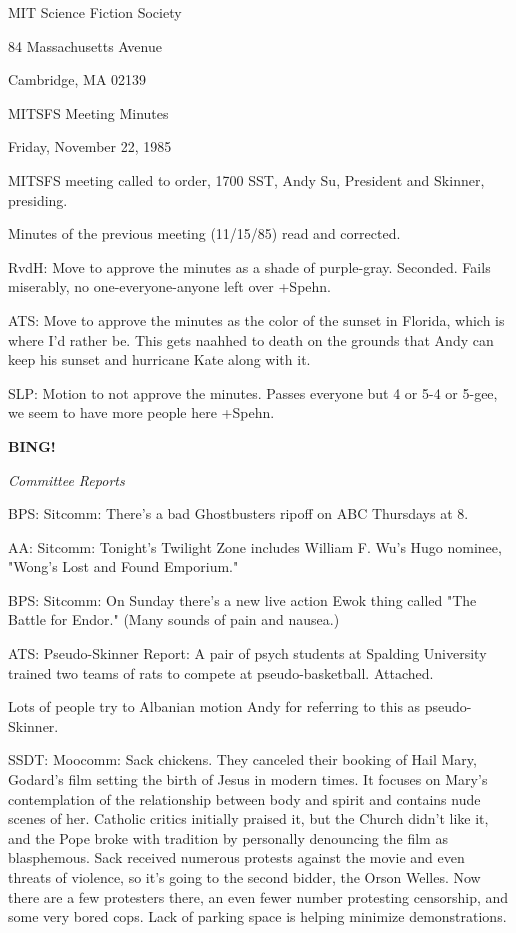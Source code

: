 \documentclass[12pt]{article}
\newcommand{\bing}{{\bf BING!} }
\newcommand{\goto}[1]{\bing \vskip 12pt \centerline{{\em{#1}}}}
\begin{document}
\begin{center}

MIT Science Fiction Society 

84 Massachusetts Avenue

Cambridge, MA 02139

\vspace{12pt}

MITSFS Meeting Minutes 

Friday, November 22, 1985

\end{center}
 
\vspace{18pt}

\setlength{\parskip}{6pt}

\noindent
MITSFS meeting called to order, 1700 SST,
Andy Su, President and Skinner, presiding.

Minutes of the previous meeting (11/15/85) read and corrected.

RvdH: Move to approve the minutes as a shade of purple-gray. Seconded. Fails miserably, no one-everyone-anyone left over +Spehn.

ATS: Move to approve the minutes as the color of the sunset in Florida, which is where I'd rather be. This gets naahhed to death on the grounds that Andy can keep his sunset and hurricane Kate along with it.

SLP: Motion to not approve the minutes. Passes everyone but 4 or 5-4 or 5-gee, we seem to have more people here +Spehn.

\goto{Committee Reports}

BPS: Sitcomm: There's a bad Ghostbusters ripoff on ABC Thursdays at 8.

AA: Sitcomm: Tonight's Twilight Zone includes William F. Wu's Hugo nominee, "Wong's Lost and Found Emporium."

BPS: Sitcomm: On Sunday there's a new live action Ewok thing called "The Battle for Endor." (Many sounds of pain and nausea.)

ATS: Pseudo-Skinner Report: A pair of psych students at Spalding University trained two teams of rats to compete at pseudo-basketball. Attached.

Lots of people try to Albanian motion Andy for referring to this as pseudo-Skinner.

SSDT: Moocomm: Sack chickens. They canceled their booking of Hail Mary, Godard's film setting the birth of Jesus in modern times. It focuses on Mary's contemplation of the relationship between body and spirit and contains nude scenes of her. Catholic critics initially praised it, but the Church didn't like it, and the Pope broke with tradition by personally denouncing the film as blasphemous. Sack received numerous protests against the movie and even threats of violence, so it's going to the second bidder, the Orson Welles. Now there are a few protesters there, an even fewer number protesting censorship, and some very bored cops. Lack of parking space is helping minimize demonstrations.
\end{document}
